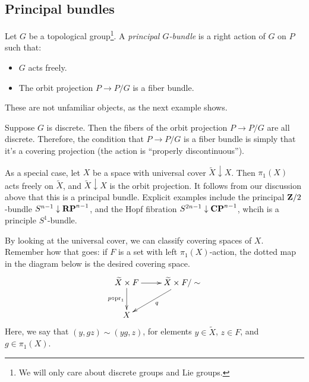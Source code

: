 \subsection{Principal bundles}
\begin{definition}\label{principaldefn}
    Let $G$ be a topological group\footnote{We will only care about discrete
    groups and Lie groups.}. A \emph{principal $G$-bundle} is a right action of
    $G$ on $P$ such that:
    \begin{itemize}
	\item $G$ acts freely.
	\item The orbit projection $P\to P/G$ is a fiber bundle.
    \end{itemize}
\end{definition}
These are not unfamiliar objects, as the next example shows.
\begin{example}\label{principalcovering}
    Suppose $G$ is discrete. Then the fibers of the orbit projection $P\to P/G$
    are all discrete. Therefore, the condition that $P\to P/G$ is a fiber
    bundle is simply that it's a covering projection (the action is ``properly
    discontinuous'').

    As a special case, let $X$ be a space with universal cover
    $\widetilde{X}\downarrow X$. Then $\pi_1(X)$ acts freely on
    $\widetilde{X}$, and $\widetilde{X}\downarrow X$ is the orbit projection.
    It follows from our discussion above that this is a principal bundle.
    Explicit examples include the principal $\mathbf Z/2$-bundle
    $S^{n-1}\downarrow\mathbf{RP}^{n-1}$, and the Hopf fibration $S^{2n-1}\downarrow
    \mathbf{CP}^{n-1}$, whcih is a principle $S^1$-bundle.
\end{example}
By looking at the universal cover, we can classify covering spaces of $X$.
Remember how that goes: if $F$ is a set with left $\pi_1(X)$-action, the dotted
map in the diagram below is the desired covering space.
\begin{equation*}
    \xymatrix{
	\widetilde{X}\times F\ar[r]\ar[d]_{p\circ \pr_1} & \widetilde{X}\times
	F/\sim\ar[dl]^q\\
	X & 
    }
\end{equation*}
Here, we say that $(y,gz)\sim (yg,z)$, for elements $y\in\widetilde{X}$, $z\in
F$, and $g\in\pi_1(X)$.

